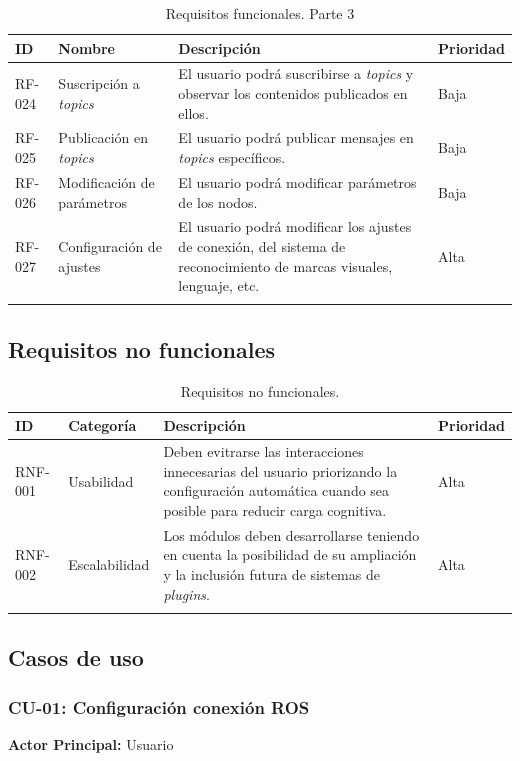 \newpage
\begin{longtable}{|p{2cm}|p{4cm}|p{7cm}|p{2cm}|}
\hline
\textbf{ID} & \textbf{Nombre} & \textbf{Descripción} & \textbf{Prioridad} \\
\hline
RF-024 & Suscripción a \textit{topics} & El usuario podrá suscribirse a \textit{topics} y observar los contenidos publicados en ellos. & Baja \\
\hline
RF-025 & Publicación en \textit{topics} & El usuario podrá publicar mensajes en \textit{topics} específicos. & Baja \\
\hline
RF-026 & Modificación de parámetros & El usuario podrá modificar parámetros de los nodos. & Baja \\
\hline
RF-027 & Configuración de ajustes & El usuario podrá modificar los ajustes de conexión, del sistema de reconocimiento de marcas visuales, lenguaje, etc. & Alta \\
\hline
\caption{Requisitos funcionales. Parte 3}
\end{longtable}

\subsection{Requisitos no funcionales}
\begin{longtable}{|p{2cm}|p{3.5cm}|p{7.5cm}|p{2cm}|}
\hline
\textbf{ID} & \textbf{Categoría} & \textbf{Descripción} & \textbf{Prioridad} \\
\hline
RNF-001 & Usabilidad & Deben evitrarse las interacciones innecesarias del usuario priorizando la configuración automática cuando sea posible para reducir carga cognitiva.  & Alta \\
\hline
RNF-002 & Escalabilidad & Los módulos deben desarrollarse teniendo en cuenta la posibilidad de su ampliación y la inclusión futura de sistemas de \textit{plugins}.  & Alta \\
\hline
\caption{Requisitos no funcionales.}
\end{longtable}

\subsection{Casos de uso}
\subsubsection{CU-01: Configuración conexión ROS}

\textbf{Actor Principal:} Usuario

